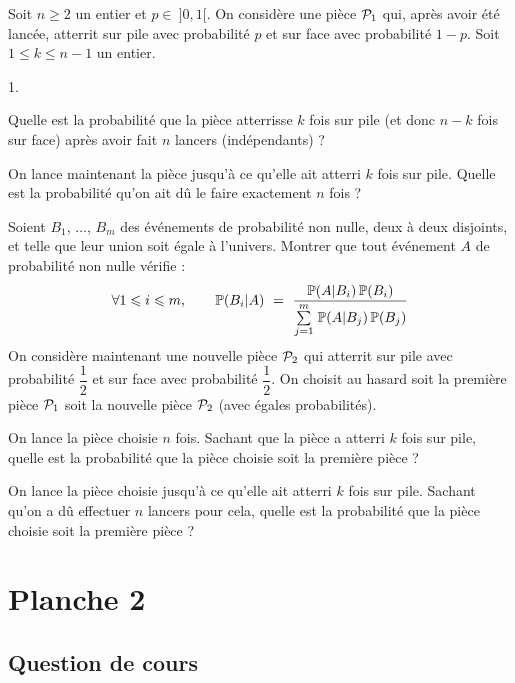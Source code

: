 \documentclass[11pt]{article}%
\begin{document}
\noindent
Soit $n \geq 2$ un entier et $p \in \ 
]0,1[$. On considère une pièce ${\cal P}_1$ qui, après avoir été 
lancée, atterrit sur pile avec probabilité $p$ et sur face avec 
probabilité $1-p$. Soit $1 \leq k \leq n-1$ un entier.
\begin{noliste}{1.}
 \item Quelle est la probabilité que la pièce atterrisse $k$ fois sur 
 pile (et donc $n-k$ fois sur face) après avoir fait $n$ lancers 
 (indépendants) ?
 
 \item On lance maintenant la pièce jusqu'à ce qu'elle ait atterri $k
 $ fois sur pile. Quelle est la probabilité qu'on ait dû le faire 
 exactement $n$ fois ?
 
 \item Soient $B_1$, $\ldots$, $B_m$ des événements de probabilité 
 non nulle, deux à deux disjoints, et telle que leur union soit égale 
 à l'univers. Montrer que tout événement $A$ de probabilité non nulle 
 vérifie :
 \[
  \forall 1 \leq i \leq m, \qquad \Prob(B_i \vert A) \ = \ 
  \dfrac{\Prob(A \vert B_i) \, \Prob(B_i)}{\Sum{j=1}{m} \Prob(A \vert 
  B_j) \, \Prob(B_j)}
 \]
 On considère maintenant une nouvelle pièce ${\cal P}_2$ qui atterrit 
 sur pile avec probabilité $\dfrac{1}{2}$ et sur face avec 
 probabilité $\dfrac{1}{2}$. On choisit au hasard soit la première 
 pièce ${\cal P}_1$ soit la nouvelle pièce ${\cal P}_2$ (avec égales 
 probabilités).
 
 \item On lance la pièce choisie $n$ fois. Sachant que la pièce a 
 atterri $k$ fois sur pile, quelle est la probabilité que la pièce 
 choisie soit la première pièce ?
 
 \item On lance la pièce choisie jusqu'à ce qu'elle ait atterri $k$ 
 fois sur pile. Sachant qu'on a dû effectuer $n$ lancers pour cela, 
 quelle est la probabilité que la pièce choisie soit la première 
 pièce ?
\end{noliste}




\newpage


\section*{Planche 2}
\subsection*{Question de cours}
\end{document}
